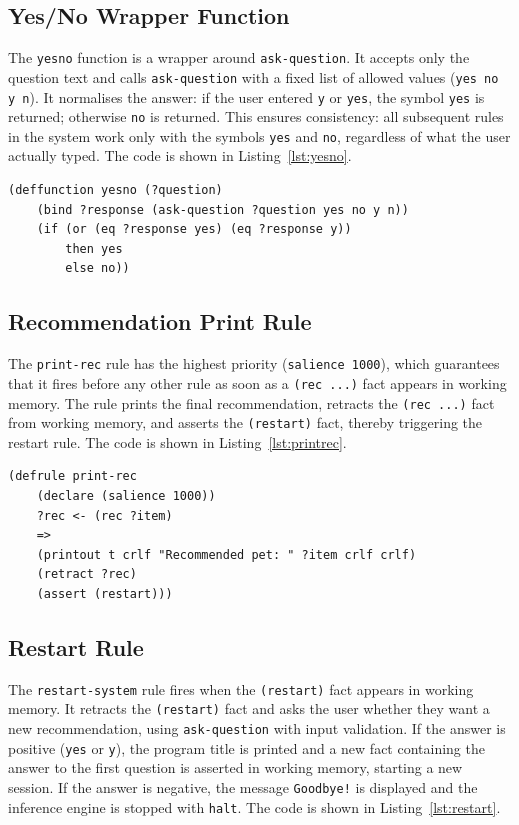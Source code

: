 \documentclass[a4paper,final]{article}
\begin{document}
\subsection{Yes/No Wrapper Function}

The \texttt{yesno} function is a wrapper around \texttt{ask-question}. It accepts only the question text and calls \texttt{ask-question} with a fixed list of allowed values (\texttt{yes no y n}). It normalises the answer: if the user entered \texttt{y} or \texttt{yes}, the symbol \texttt{yes} is returned; otherwise \texttt{no} is returned. This ensures consistency: all subsequent rules in the system work only with the symbols \texttt{yes} and \texttt{no}, regardless of what the user actually typed. The code is shown in Listing~\ref{lst:yesno}.

\begin{lstlisting}[language=CLIPS,
	caption={The yesno function},
	label=lst:yesno]
(deffunction yesno (?question)
    (bind ?response (ask-question ?question yes no y n))
    (if (or (eq ?response yes) (eq ?response y))
        then yes
        else no))
\end{lstlisting}

\subsection{Recommendation Print Rule}

The \texttt{print-rec} rule has the highest priority (\texttt{salience~1000}), which guarantees that it fires before any other rule as soon as a \texttt{(rec~...)} fact appears in working memory. The rule prints the final recommendation, retracts the \texttt{(rec~...)} fact from working memory, and asserts the \texttt{(restart)} fact, thereby triggering the restart rule. The code is shown in Listing~\ref{lst:printrec}.

\begin{lstlisting}[language=CLIPS,
	caption={The print-rec rule},
	label=lst:printrec]
(defrule print-rec
    (declare (salience 1000))
    ?rec <- (rec ?item)
    =>
    (printout t crlf "Recommended pet: " ?item crlf crlf)
    (retract ?rec)
    (assert (restart)))
\end{lstlisting}

\subsection{Restart Rule}

The \texttt{restart-system} rule fires when the \texttt{(restart)} fact appears in working memory. It retracts the \texttt{(restart)} fact and asks the user whether they want a new recommendation, using \texttt{ask-question} with input validation. If the answer is positive (\texttt{yes} or \texttt{y}), the program title is printed and a new fact containing the answer to the first question is asserted in working memory, starting a new session. If the answer is negative, the message \texttt{Goodbye!} is displayed and the inference engine is stopped with \texttt{halt}. The code is shown in Listing~\ref{lst:restart}.
\end{document}
